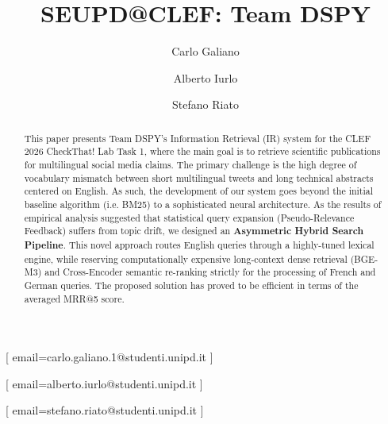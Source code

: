 \documentclass{ceurart}
\begin{document}



\title{SEUPD@CLEF: Team DSPY}

\author[1]{Carlo Galiano}[%
email=carlo.galiano.1@studenti.unipd.it
]

\author[1]{Alberto Iurlo}[%
email=alberto.iurlo@studenti.unipd.it
]

\author[1]{Stefano Riato}[%
email=stefano.riato@studenti.unipd.it
]

\address[1]{University of Padua, Italy}


\begin{abstract}
  This paper presents Team DSPY's Information Retrieval (IR) system for the CLEF 2026 CheckThat! Lab Task 1, 
  where the main goal is to retrieve scientific publications for multilingual social media claims. 
  The primary challenge is the high degree of vocabulary mismatch between short multilingual tweets and long technical abstracts 
  centered on English. As such, the development of our system goes beyond the initial baseline algorithm (i.e. BM25) 
  to a sophisticated neural architecture. As the results of empirical analysis suggested that statistical query expansion 
  (Pseudo-Relevance Feedback) suffers from topic drift, we designed an \textbf{Asymmetric Hybrid Search Pipeline}. 
  This novel approach routes English queries through a highly-tuned lexical engine, while reserving computationally expensive 
  long-context dense retrieval (BGE-M3) and Cross-Encoder semantic re-ranking strictly for the processing of French and German queries. 
  The proposed solution has proved to be efficient in terms of the averaged MRR@5 score.
\end{abstract}
\end{document}
